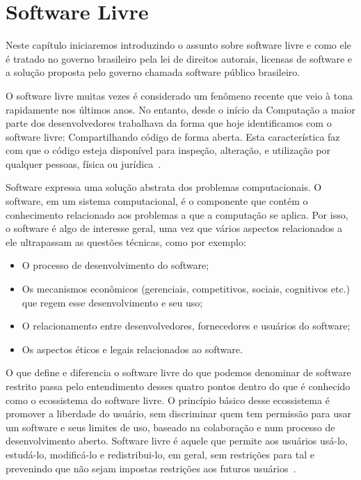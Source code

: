 \chapter[Software Livre]{Software Livre}
\label{software_livre}

Neste capítulo iniciaremos introduzindo o assunto sobre software livre e como ele é
tratado no governo brasileiro pela lei de direitos autorais, licensas de software e 
a solução proposta pelo governo chamada software público brasileiro. 

O software livre muitas vezes é considerado um fenômeno recente que veio à tona
rapidamente nos últimos anos. No entanto, desde o início da Computação a maior parte
dos desenvolvedores trabalhava da forma que hoje identificamos com o software livre:
Compartilhando código de forma aberta. Esta característica 
faz com que o código esteja disponível para inspeção, alteração, e utilização por qualquer
pessoas, física ou jurídica~\cite{kon2012software, Hippel:2003:OSS:970521.970585}.


Software expressa uma solução abstrata dos problemas computacionais. O software, em um
sistema computacional, é o componente que contém o conhecimento relacionado aos problemas a
que a computação se aplica. Por isso, o software é algo de interesse geral, uma vez que vários
aspectos relacionados a ele ultrapassam as questões técnicas, como por exemplo:

\begin{itemize}

\item O processo de desenvolvimento do software;

\item Os mecanismos econômicos (gerenciais, competitivos, sociais, cognitivos etc.) que regem esse
desenvolvimento e seu uso;

\item O relacionamento entre desenvolvedores, fornecedores e usuários do software;

\item Os aspectos éticos e legais relacionados ao software.

\end{itemize}

O que define e diferencia o software livre do que podemos denominar de software restrito passa
pelo entendimento desses quatro pontos dentro do que é conhecido como o ecossistema do 
software livre. O princípio básico desse ecossistema é promover a liberdade do 
usuário, sem discriminar quem tem permissão para usar um software e seus limites 
de uso, baseado na colaboração e num processo de desenvolvimento aberto. Software 
livre é aquele que permite aos usuários usá-lo, estudá-lo, modificá-lo e redistribui-lo, 
em geral, sem restrições para tal e prevenindo que não sejam impostas restrições aos 
futuros usuários~\cite{meirelles2013metrics}.

